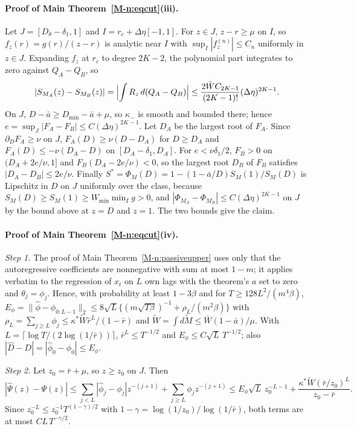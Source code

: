 \documentclass[12pt]{article}
\theoremstyle{definition}
\theoremstyle{remark}
\begin{document}
\paragraph{Proof of Main Theorem~\ref{M-n:eqcut}(iii).} Let $J = [D_\theta - \delta_1, 1]$ and $I = r_c + \Delta\eta[-1, 1]$. For $z \in J$, $z - r \ge \mu$ on $I$, so $f_z(r) = g(r)/(z - r)$ is analytic near $I$ with $\sup_I |f_z^{(n)}| \le C_n$ uniformly in $z \in J$. Expanding $f_z$ at $r_c$ to degree $2K - 2$, the polynomial part integrates to zero against $Q_A - Q_B$, so
\[
  |S_{M_A}(z) - S_{M_B}(z)| = \Bigl|\int R_z\, d(Q_A - Q_B)\Bigr| \le \frac{2\bar W C_{2K-1}}{(2K-1)!}(\Delta\eta)^{2K-1}.
\]
On $J$, $D - \bar a \ge D_{\min} - \bar a + \mu$, so $\kappa_-$ is smooth and bounded there; hence $e = \sup_J |F_A - F_B| \le C(\Delta\eta)^{2K-1}$. Let $D_A$ be the largest root of $F_A$. Since $\partial_D F_A \ge \nu$ on $J$, $F_A(D) \ge \nu(D - D_A)$ for $D \ge D_A$ and $F_A(D) \le -\nu(D_A - D)$ on $[D_A - \delta_1, D_A]$. For $e < \nu\delta_1/2$, $F_B > 0$ on $(D_A + 2e/\nu, 1]$ and $F_B(D_A - 2e/\nu) < 0$, so the largest root $D_B$ of $F_B$ satisfies $|D_A - D_B| \le 2e/\nu$. Finally $S^* = \Phi_M(D) = 1 - (1 - \bar a/D)S_M(1)/S_M(D)$ is Lipschitz in $D$ on $J$ uniformly over the class, because $S_M(D) \ge S_M(1) \ge W_{\min}\min_I g > 0$, and $|\Phi_{M_A} - \Phi_{M_B}| \le C(\Delta\eta)^{2K-1}$ on $J$ by the bound above at $z = D$ and $z = 1$. The two bounds give the claim.

\paragraph{Proof of Main Theorem~\ref{M-n:eqcut}(iv).} \emph{Step 1.} The proof of Main Theorem~\ref{M-n:passiveupper} uses only that the autoregressive coefficients are nonnegative with sum at most $1 - m$; it applies verbatim to the regression of $x_t$ on $L$ own lags with the theorem's $a$ set to zero and $\theta_j = \phi_j$. Hence, with probability at least $1 - 3\beta$ and for $T \ge 128L^2/(m^4\beta)$, $E_\phi = \|\hat\phi - \phi_{0:L-1}\|_2 \le 8\sqrt L\{(m\sqrt{T\beta})^{-1} + \rho_L/(m^2\beta)\}$ with $\rho_L = \sum_{j \ge L}\phi_j \le \kappa^*\tilde W\bar r^L/(1 - \bar r)$ and $\tilde W = \int d\tilde M \le \bar W(1 - \bar a)/\mu$. With $L = \lceil \log T/(2\log(1/\bar r))\rceil$, $\bar r^L \le T^{-1/2}$ and $E_\phi \le C\sqrt L\, T^{-1/2}$; also $|\hat D - D| = |\hat\phi_0 - \phi_0| \le E_\phi$.

\emph{Step 2.} Let $z_0 = \bar r + \mu$, so $z \ge z_0$ on $J$. Then
\[
  |\hat\Psi(z) - \Psi(z)| \le \sum_{j < L} |\hat\phi_j - \phi_j| z^{-(j+1)} + \sum_{j \ge L} \phi_j z^{-(j+1)} \le E_\phi\sqrt L\, z_0^{-L-1} + \frac{\kappa^*\tilde W (\bar r/z_0)^L}{z_0 - \bar r}.
\]
Since $z_0^{-L} \le z_0^{-1}T^{(1-\gamma)/2}$ with $1 - \gamma = \log(1/z_0)/\log(1/\bar r)$, both terms are at most $C L\, T^{-\gamma/2}$.
\end{document}
